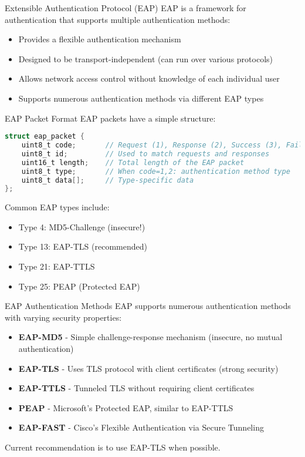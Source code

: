 \begin{definition}{Extensible Authentication Protocol (EAP)}
EAP is a framework for authentication that supports multiple authentication methods:
\begin{itemize}
    \item Provides a flexible authentication mechanism
    \item Designed to be transport-independent (can run over various protocols)
    \item Allows network access control without knowledge of each individual user
    \item Supports numerous authentication methods via different EAP types
\end{itemize}
\end{definition}

\begin{code}{EAP Packet Format}
EAP packets have a simple structure:
\begin{lstlisting}[language=C, style=basesmol]
struct eap_packet {
    uint8_t code;       // Request (1), Response (2), Success (3), Failure (4)
    uint8_t id;         // Used to match requests and responses
    uint16_t length;    // Total length of the EAP packet
    uint8_t type;       // When code=1,2: authentication method type
    uint8_t data[];     // Type-specific data
};
\end{lstlisting}

Common EAP types include:
\begin{itemize}
    \item Type 4: MD5-Challenge (insecure!)
    \item Type 13: EAP-TLS (recommended)
    \item Type 21: EAP-TTLS
    \item Type 25: PEAP (Protected EAP)
\end{itemize}
\end{code}

\begin{concept}{EAP Authentication Methods}
EAP supports numerous authentication methods with varying security properties:
\begin{itemize}
    \item \textbf{EAP-MD5} - Simple challenge-response mechanism (insecure, no mutual authentication)
    \item \textbf{EAP-TLS} - Uses TLS protocol with client certificates (strong security)
    \item \textbf{EAP-TTLS} - Tunneled TLS without requiring client certificates
    \item \textbf{PEAP} - Microsoft's Protected EAP, similar to EAP-TTLS
    \item \textbf{EAP-FAST} - Cisco's Flexible Authentication via Secure Tunneling
\end{itemize}
Current recommendation is to use EAP-TLS when possible.
\end{concept}

